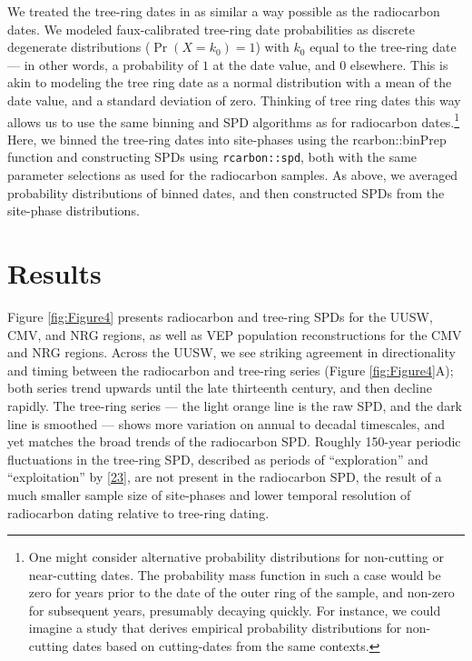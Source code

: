 \documentclass[
]{sa}
\begin{document}
We treated the tree-ring dates in as similar a way possible as the radiocarbon dates. We modeled faux-calibrated tree-ring date probabilities as discrete degenerate distributions (\(\Pr(X=k_0)=1\)) with \(k_0\) equal to the tree-ring date --- in other words, a probability of \(1\) at the date value, and \(0\) elsewhere. This is akin to modeling the tree ring date as a normal distribution with a mean of the date value, and a standard deviation of zero. Thinking of tree ring dates this way allows us to use the same binning and SPD algorithms as for radiocarbon dates.\footnote{One might consider alternative probability distributions for non-cutting or near-cutting dates. The probability mass function in such a case would be zero for years prior to the date of the outer ring of the sample, and non-zero for subsequent years, presumably decaying quickly. For instance, we could imagine a study that derives empirical probability distributions for non-cutting dates based on cutting-dates from the same contexts.} Here, we binned the tree-ring dates into site-phases using the rcarbon::binPrep function and constructing SPDs using \texttt{rcarbon::spd}, both with the same parameter selections as used for the radiocarbon samples. As above, we averaged probability distributions of binned dates, and then constructed SPDs from the site-phase distributions.

\hypertarget{results}{%
\section*{Results}\label{results}}

Figure \ref{fig:Figure4} presents radiocarbon and tree-ring SPDs for the UUSW, CMV, and NRG regions, as well as VEP population reconstructions for the CMV and NRG regions. Across the UUSW, we see striking agreement in directionality and timing between the radiocarbon and tree-ring series (Figure \ref{fig:Figure4}A); both series trend upwards until the late thirteenth century, and then decline rapidly. The tree-ring series --- the light orange line is the raw SPD, and the dark line is smoothed --- shows more variation on annual to decadal timescales, and yet matches the broad trends of the radiocarbon SPD. Roughly 150-year periodic fluctuations in the tree-ring SPD, described as periods of ``exploration'' and ``exploitation'' by {[}\protect\hyperlink{ref-Bocinsky2016}{23}{]}, are not present in the radiocarbon SPD, the result of a much smaller sample size of site-phases and lower temporal resolution of radiocarbon dating relative to tree-ring dating.
\end{document}
